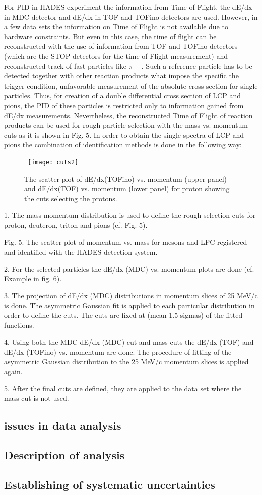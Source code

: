 For PID in HADES experiment the information from Time of Flight, the dE/dx in MDC detector and dE/dx in TOF and TOFino detectors are used. However, in a few data sets the information on Time of Flight is not available due to hardware constraints. But even in this case, the time of flight can be reconstructed with the use of information from TOF and TOFino detectors (which are the STOP detectors for the time of Flight measurement) and reconstructed track of fast particles like $\pi-$.  Such a reference particle has to be detected together with other reaction products what impose the specific the trigger condition, unfavorable measurement of the absolute cross section for single particles. Thus, for creation of a double differential cross section of LCP and pions, the PID of these particles is restricted only to information gained from dE/dx measurements. Nevertheless, the reconstructed Time of Flight of reaction products can be used for rough particle selection with the mass vs. momentum cuts as it is shown in Fig. 5.
In order to obtain the single spectra of LCP and pions the combination of identification methods is done in the following way:
\begin{figure}
	\centering\
	\texttt{[image: cuts2]}
	\caption{The scatter plot of dE/dx(TOFino) vs. momentum (upper panel) and dE/dx(TOF) vs. momentum (lower panel) for proton showing the cuts selecting the protons.}
	\label{TofCut}
\end{figure}
1. The mass-momentum distribution is used to define the rough selection cuts for proton, deuteron, triton and pions (cf. Fig. 5).



Fig. 5. The scatter plot of momentum vs. mass for mesons and LPC registered and identified with the HADES detection system.


2. For the selected particles the dE/dx (MDC) vs. momentum plots are done (cf. Example in fig. 6).

3. The projection of dE/dx (MDC) distributions in momentum slices of 25 MeV/c is done. The asymmetric Gaussian fit is applied to each particular distribution in order to define the cuts. The cuts are fixed at (mean 1.5 sigmas) of the fitted functions.

4. Using both the MDC dE/dx (MDC) cut and mass cuts the dE/dx (TOF) and dE/dx (TOFino) vs. momentum are done. The procedure of fitting of the asymmetric Gaussian distribution to the 25 MeV/c momentum slices is applied again.

5. After the final cuts are defined, they are applied to the data set where the mass cut is not used.


\subsection{issues in data analysis}
\subsection{Description of analysis}
\subsection{Establishing of systematic uncertainties}